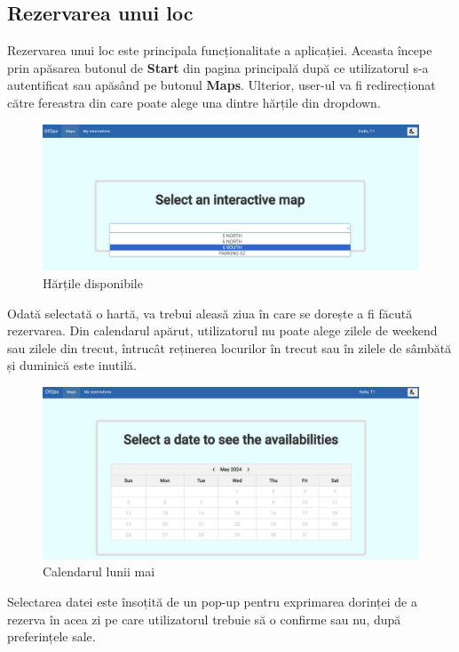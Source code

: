 \subsection{Rezervarea unui loc}

Rezervarea unui loc este principala funcționalitate a aplicației. Aceasta începe prin apăsarea butonul de \textbf{Start} din pagina principală după ce utilizatorul s-a autentificat sau apăsând pe butonul \textbf{Maps}. Ulterior, user-ul va fi redirecționat către fereastra din care poate alege una dintre hărțile din dropdown. 

\begin{figure}[!htb]
    \centering
    \includegraphics[width=0.9\linewidth]{images/harti.png}
    \caption{Hărțile disponibile}
    \label{fig:harti}
\end{figure}

Odată selectată o hartă, va trebui aleasă ziua în care se dorește a fi făcută rezervarea. Din calendarul apărut, utilizatorul nu poate alege zilele de weekend sau zilele din trecut, întrucât reținerea locurilor în trecut sau în zilele de sâmbătă și duminică este inutilă.  

\begin{figure}[!htb]
    \centering
    \includegraphics[width=0.9\linewidth]{images/calendar vechi.png}
    \caption{Calendarul lunii mai}
    \label{fig:calendarvechi}
\end{figure}

Selectarea datei este însoțită de un pop-up pentru exprimarea dorinței de a rezerva în acea zi pe care utilizatorul trebuie să o confirme sau nu, după preferințele sale.


